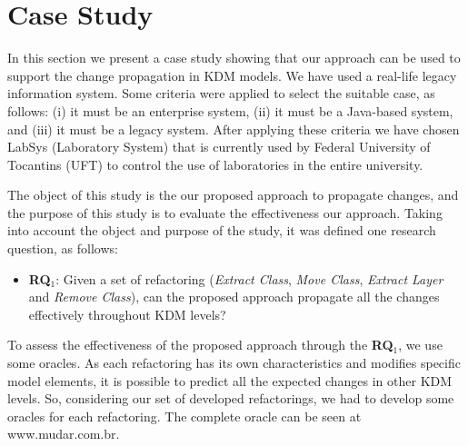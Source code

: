 
\section{Case Study}\label{sec:case_study}

In this section we present a case study showing that our approach can be used to support the change propagation in KDM models. We have used a real-life legacy information system. Some criteria were applied to select the suitable case, as follows: (i) it must be an enterprise system, (ii) it must be a Java-based system, and (iii) it must be a legacy system. After applying these criteria we have chosen LabSys (Laboratory System) that is currently used by Federal University of Tocantins (UFT) to control the use of laboratories in the entire university. 

The object of this study is the our proposed approach to propagate  changes, and the purpose of this study is to evaluate the  effectiveness our approach. Taking into account the object and purpose of the study, it was defined one research question, as follows:

\begin{itemize}
\item \textbf{RQ$_1$}: Given a set of refactoring (\textit{Extract Class}, \textit{Move Class}, \textit{Extract Layer} and \textit{Remove Class}), can the proposed approach propagate all the changes effectively throughout KDM levels?
\end{itemize}

To assess the effectiveness of the proposed approach through the \textbf{RQ$_1$}, we use some oracles. As each refactoring has its own characteristics and modifies specific model elements, it is possible to predict all the expected changes in other KDM levels. So, considering our set of developed refactorings, we had to develop some oracles for each refactoring. The complete oracle can be seen at www.mudar.com.br.

